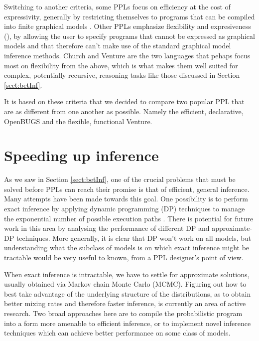 Switching to another criteria, some PPLs focus on efficiency at the cost of expressivity, generally by restricting themselves to programs that can be compiled into finite graphical models \cite{lunn2009bugs, richardson2006markov, mccallum2009factorie, stan-software:2014, minkainfer}. Other PPLs emphasize flexibility and expresiveness (\cite{milch20071, pfeffer2001ibal, pfeffer2009figaro, goodman2008church}), by allowing the user to specify programs that cannot be expressed as graphical models and that therefore can't make use of the standard graphical model inference methods. Church and Venture are the two languages that pehaps focus most on flexibility from the above, which is what makes them well suited for complex, potentially recursive, reasoning tasks like those discussed in Section \ref{sect:betInf}.

It is based on these criteria that we decided to compare two popular PPL that are as different from one another as possible. Namely the efficient, declarative, OpenBUGS and the flexible, functional Venture.

\section{Speeding up inference}

As we saw in Section \ref{sect:betInf}, one of the crucial problems that must be solved before PPLs can reach their promise is that of efficient, general inference. Many attempts have been made towards this goal. One possibility is to perform exact inference by applying dynamic programming (DP) techniques to manage the exponential number of possible execution paths \cite{stuhlmuller2012dynamic}. There is potential for future work in this area by analysing the performance of different DP and approximate-DP techniques. More generally, it is clear that DP won’t work on all models, but understanding what the subclass of models is on which exact inference might be tractable would be very useful to known, from a PPL designer's point of view.

When exact inference is intractable, we have to settle for approximate solutions, usually obtained via Markov chain Monte Carlo (MCMC). Figuring out how to best take advantage of the underlying structure
of the distributions, as to obtain better mixing rates and therefore faster inference, is currently an area of active research. Two broad approaches here are to compile the probabilistic program into a form more amenable to efficient inference, or to implement novel inference techniques which can achieve better performance on some class of models.

